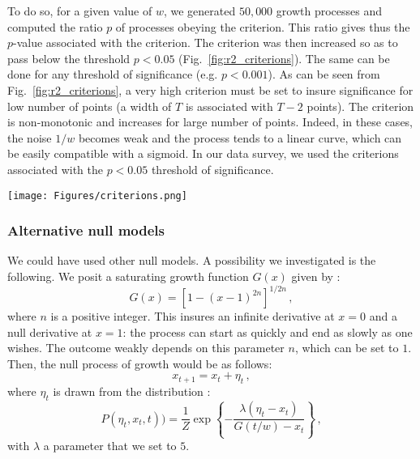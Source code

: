 \documentclass[12pt,twocolumn,amsmath,amssymb,aps,longbibliography]{revtex4-1}  %
\begin{document}
To do so, for a given value of $w$, we generated $50,000$ growth processes and computed the ratio $p$ of processes obeying the criterion. This ratio gives thus the $p$-value associated with the criterion. The criterion was then increased so as to pass below the threshold $p<0.05$  (Fig.~\ref{fig:r2_criterions}). The same can be done for any threshold of significance (e.g. $p<0.001$). As can be seen from Fig.~\ref{fig:r2_criterions}, a very high criterion must be set to insure significance for low number of points (a width of $T$ is associated with $T-2$ points). The criterion is non-monotonic and increases for large number of points. Indeed, in these cases, the noise $1/w$ becomes weak and the process tends to a linear curve, which can be easily compatible with a sigmoid. In our data survey, we used the criterions associated with the $p < 0.05$ threshold of significance.

\begin{figure*}[!bp]
  \centering
  \texttt{[image: Figures/criterions.png]}
  \caption{Minimal quality of the linear fit of the logit transform so as to insure the significance of a sigmoidal fit of the data as compared to a random null model of frequency growth.}
  \label{fig:r2_criterions}
\end{figure*}

\subsubsection{Alternative null models}

We could have used other null models. A possibility we investigated is the following. We posit a saturating growth function $G(x)$ given by :
\begin{equation}
G(x) = \left[ 1 - (x - 1) ^{2n} \right]^{1/2n} \, ,
\end{equation}
where $n$ is a positive integer. This insures an infinite derivative at $x = 0$ and a null derivative at $x =1$: the process can start as quickly and end as slowly as one wishes. The outcome weakly depends on this parameter $n$, which can be set to $1$. Then, the null process of growth would be as follows:
\begin{equation}
x_{t+1} = x_t + \eta_t \, ,
\end{equation}
where $\eta_t$ is drawn from the distribution :
\begin{equation}
P(\eta_t,x_t, t)) = \frac{1}{Z} \exp \left\{ -  \frac{\lambda (\eta_t -x_t)}{G(t /w) - x_t}  \right\} \, ,
\end{equation}
with $\lambda$ a parameter that we set to $5$. 
\end{document}
